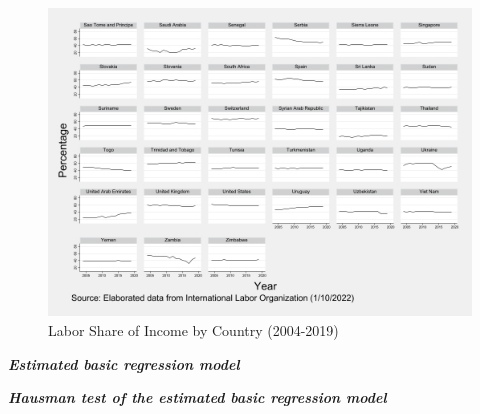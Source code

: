 \documentclass[12pt, letterpaper]{article}
\numberwithin{table}{section}   %
\begin{document}
\begin{figure}[htp]
    \centering
    \includegraphics[width=14cm]{Countries153.jpg}
    \caption{Labor Share of Income by Country (2004-2019)}
    \label{fig:4-5}
\end{figure}

%       
%        

\begin{table}[htbp!]
\small
\caption{\textbf{\textit{Estimated basic regression model}}} \label{tab:firstreg}
    \begin{center}
        
    \end{center} 
\end{table}

\begin{table}[htbp!]
\small
\caption{\textbf{\textit{Hausman test of the estimated basic regression model}}} \label{tab:haus1}
    \begin{center}
        
    \end{center} 
\end{table}
\end{document}
